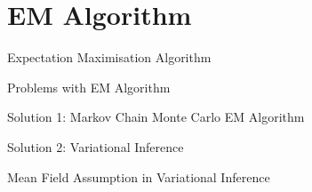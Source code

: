 \section*{EM Algorithm}
\begin{frame}{Expectation Maximisation Algorithm}

\end{frame}

\begin{frame}{Problems with EM Algorithm}
    
\end{frame}

\begin{frame}{Solution 1: Markov Chain Monte Carlo EM Algorithm}

\end{frame}

\begin{frame}{Solution 2: Variational Inference}

\end{frame}

\begin{frame}{Mean Field Assumption in Variational Inference}

\end{frame}